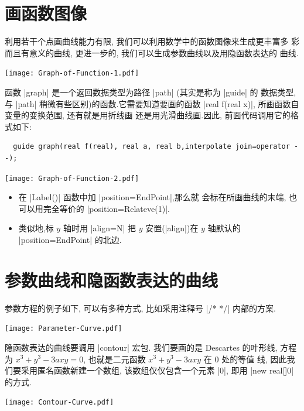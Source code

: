 \documentclass[nofonts,CJKnormalspaces]{ctexbook}
\begin{document}
\section{画函数图像}
利用若干个点画曲线能力有限, 我们可以利用数学中的函数图像来生成更丰富多
彩而且有意义的曲线, 更进一步的, 我们可以生成参数曲线以及用隐函数表达的
曲线.
\begin{center}\texttt{[image: Graph-of-Function-1.pdf]}\end{center}%


函数 |graph| 是一个返回数据类型为路径 |path| (其实是称为 |guide| 的
数据类型, 与 |path| 稍微有些区别)的函数.它需要知道要画的函数
|real f(real x)|,  所画函数自变量的变换范围, 还有就是用折线画
还是用光滑曲线画.因此, 前面代码调用它的格式如下:
\begin{lstlisting}
  guide graph(real f(real), real a, real b,interpolate join=operator --);
\end{lstlisting}

\begin{center}\texttt{[image: Graph-of-Function-2.pdf]}\end{center}%


\begin{itemize}
\item 在 |Label()| 函数中加 |position=EndPoint|,那么就
  会标在所画曲线的末端, 也可以用完全等价的 |position=Relateve(1)|.
\item  类似地,标 $y$ 轴时用 |align=N| 把 $y$ 安置(|align|)在 $y$ 轴默认的
  |position=EndPoint| 的北边.
\end{itemize}

\section{参数曲线和隐函数表达的曲线}
参数方程的例子如下, 可以有多种方式, 比如采用注释号 |/* */| 内部的方案.

\begin{center}\texttt{[image: Parameter-Curve.pdf]}\end{center}%

隐函数表达的曲线要调用 |contour| 宏包. 我们要画的是 Descartes 的叶形线,
方程为 $x^3+y^3-3axy=0$, 也就是二元函数 $x^3+y^3-3axy$ 在 $0$ 处的等值
线, 因此我们要采用匿名函数新建一个数组, 该数组仅仅包含一个元素 |{0}|,
即用 |new real[]{0}| 的方式.
\begin{center}\texttt{[image: Contour-Curve.pdf]}\end{center}%

\end{document}
